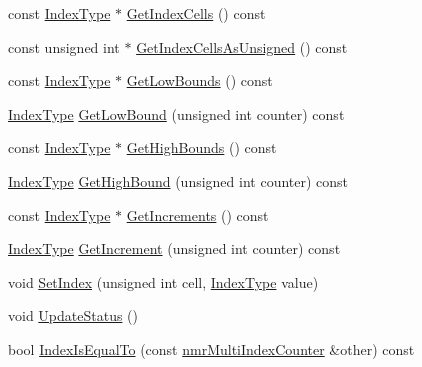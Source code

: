 \begin{DoxyCompactItemize}
const \hyperlink{classnmr_multi_index_counter_a0632b941a7d18df347174b4345d73d01}{Index\+Type} $\ast$ \hyperlink{classnmr_multi_index_counter_a019838a51b11082ab44a96e2cff6cc87}{Get\+Index\+Cells} () const 
\item 
const unsigned int $\ast$ \hyperlink{classnmr_multi_index_counter_ace36b5b9a81d09e71cb3328e7077803d}{Get\+Index\+Cells\+As\+Unsigned} () const 
\item 
const \hyperlink{classnmr_multi_index_counter_a0632b941a7d18df347174b4345d73d01}{Index\+Type} $\ast$ \hyperlink{classnmr_multi_index_counter_a3d40fe291e5a16c3aedc034914e3ab96}{Get\+Low\+Bounds} () const 
\item 
\hyperlink{classnmr_multi_index_counter_a0632b941a7d18df347174b4345d73d01}{Index\+Type} \hyperlink{classnmr_multi_index_counter_aae80c4130fd2a3c4272b4aad69f97a6c}{Get\+Low\+Bound} (unsigned int counter) const 
\item 
const \hyperlink{classnmr_multi_index_counter_a0632b941a7d18df347174b4345d73d01}{Index\+Type} $\ast$ \hyperlink{classnmr_multi_index_counter_a3ba9efd862ef333a3c6875e60a0b7098}{Get\+High\+Bounds} () const 
\item 
\hyperlink{classnmr_multi_index_counter_a0632b941a7d18df347174b4345d73d01}{Index\+Type} \hyperlink{classnmr_multi_index_counter_a569847ae686881f21f6e9e78888df3a2}{Get\+High\+Bound} (unsigned int counter) const 
\item 
const \hyperlink{classnmr_multi_index_counter_a0632b941a7d18df347174b4345d73d01}{Index\+Type} $\ast$ \hyperlink{classnmr_multi_index_counter_a18395a3904f27dd5cf71c031987bd3d6}{Get\+Increments} () const 
\item 
\hyperlink{classnmr_multi_index_counter_a0632b941a7d18df347174b4345d73d01}{Index\+Type} \hyperlink{classnmr_multi_index_counter_a940af4b0bf874b49ee3b88ccc8197dbe}{Get\+Increment} (unsigned int counter) const 
\item 
void \hyperlink{classnmr_multi_index_counter_a61e0301bf7b5ec02534740217c1ed1e6}{Set\+Index} (unsigned int cell, \hyperlink{classnmr_multi_index_counter_a0632b941a7d18df347174b4345d73d01}{Index\+Type} value)
\item 
void \hyperlink{classnmr_multi_index_counter_ac8b6bc2c60b5446aaaf20bd569fb5e61}{Update\+Status} ()
\item 
bool \hyperlink{classnmr_multi_index_counter_a3700909e665bce2008d94272172d7f4a}{Index\+Is\+Equal\+To} (const \hyperlink{classnmr_multi_index_counter}{nmr\+Multi\+Index\+Counter} \&other) const 
\item 

\end{DoxyCompactItemize}
